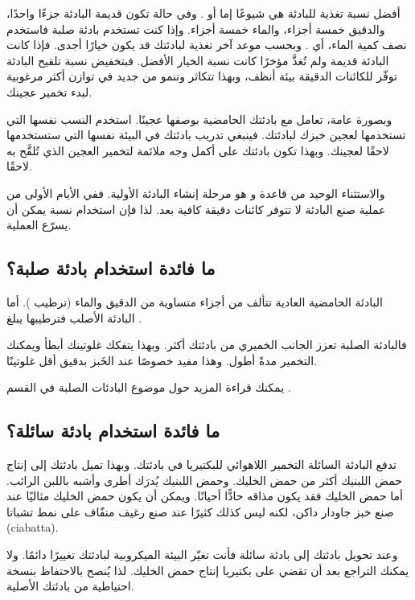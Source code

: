 أفضل نسبة تغذية للبادئة هي شيوعًا إما  أو . وفي حالة  تكون قديمة البادئة جزءًا واحدًا، والدقيق خمسة أجزاء، والماء خمسة أجزاء. وإذا كنت تستخدم بادئة صلبة فاستخدم نصف كمية الماء، أي . وبحسب موعد آخر تغذية لبادئتك قد يكون  خيارًا أجدى. فإذا كانت البادئة قديمة ولم تُغذَّ مؤخرًا كانت نسبة  الخيار الأفضل. فبتخفيض نسبة تلقيح البادئة توفّر للكائنات الدقيقة بيئة أنظف، وبهذا تتكاثر وتنمو من جديد في توازن أكثر مرغوبية لبدء تخمير عجينك.

وبصورة عامة، تعامل مع بادئتك الحامضية بوصفها عجينًا. استخدم النسب نفسها التي تستخدمها لعجين خبزك لبادئتك. فينبغي تدريب بادئتك في البيئة نفسها التي ستستخدمها لاحقًا لعجينك. وبهذا تكون بادئتك على أكمل وجه ملائمة لتخمير العجين الذي تُلقَّح به لاحقًا.

والاستثناء الوحيد من قاعدة  و هو مرحلة إنشاء البادئة الأولية. ففي الأيام الأولى من عملية صنع البادئة لا تتوفر كائنات دقيقة كافية بعد. لذا فإن استخدام نسبة  يمكن أن يسرّع العملية.

\subsection{ما فائدة استخدام بادئة صلبة؟}

البادئة الحامضية العادية تتألف من أجزاء متساوية من الدقيق والماء (ترطيب ). أما البادئة الأصلب فترطيبها يبلغ .

فالبادئة الصلبة تعزز الجانب الخميري من بادئتك أكثر. وبهذا يتفكك غلوتينك أبطأ ويمكنك التخمير مدةً أطول. وهذا مفيد خصوصًا عند الخَبز بدقيق أقل غلوتينًا.

يمكنك قراءة المزيد حول موضوع البادئات الصلبة في القسم .

\subsection{ما فائدة استخدام بادئة سائلة؟}

تدفع البادئة السائلة التخمير اللاهوائي للبكتيريا في بادئتك. وبهذا تميل بادئتك إلى إنتاج حمض اللبنيك أكثر من حمض الخليك. وحمض اللبنيك يُدرَك أطرى وأشبه باللبن الرائب. أما حمض الخليك فقد يكون مذاقه حادًّا أحيانًا. ويمكن أن يكون حمض الخليك مثاليًا عند صنع خبز جاودار داكن، لكنه ليس كذلك كثيرًا عند صنع رغيف منفّاف على نمط تشباتا \textenglish{(ciabatta)}.

وعند تحويل بادئتك إلى بادئة سائلة فأنت تغيّر البيئة الميكروبية لبادئتك تغييرًا دائمًا. ولا يمكنك التراجع بعد أن تقضي على بكتيريا إنتاج حمض الخليك. لذا يُنصح بالاحتفاظ بنسخة احتياطية من بادئتك الأصلية.

